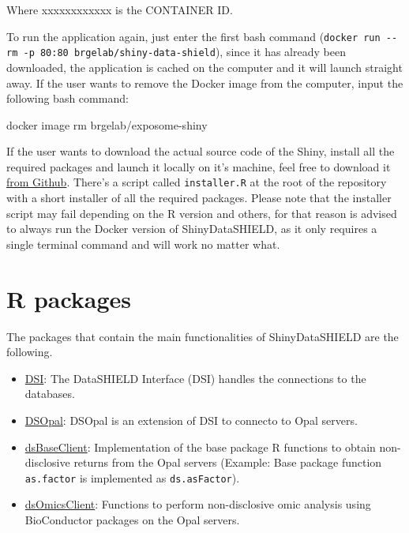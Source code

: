 \documentclass[
]{book}
\newenvironment{Shaded}{\begin{snugshade}}{\end{snugshade}}
\newcommand{\ExtensionTok}[1]{#1}
\newcommand{\NormalTok}[1]{#1}
\providecommand{\tightlist}{%
  \setlength{\itemsep}{0pt}\setlength{\parskip}{0pt}}
\begin{document}
Where xxxxxxxxxxxx is the CONTAINER ID.

To run the application again, just enter the first bash command (\texttt{docker\ run\ -\/-rm\ -p\ 80:80\ brgelab/shiny-data-shield}), since it has already been downloaded, the application is cached on the computer and it will launch straight away. If the user wants to remove the Docker image from the computer, input the following bash command:

\begin{Shaded}
\begin{Highlighting}[]
\ExtensionTok{docker}\NormalTok{ image rm brgelab/exposome-shiny}
\end{Highlighting}
\end{Shaded}

If the user wants to download the actual source code of the Shiny, install all the required packages and launch it locally on it's machine, feel free to download it \href{https://github.com/isglobal-brge/dsOmicsShiny}{from Github}. There's a script called \texttt{installer.R} at the root of the repository with a short installer of all the required packages. Please note that the installer script may fail depending on the R version and others, for that reason is advised to always run the Docker version of ShinyDataSHIELD, as it only requires a single terminal command and will work no matter what.

\hypertarget{r-packages}{%
\chapter{R packages}\label{r-packages}}

The packages that contain the main functionalities of ShinyDataSHIELD are the following.

\begin{itemize}
\tightlist
\item
  \href{https://github.com/datashield/DSI}{DSI}: The DataSHIELD Interface (DSI) handles the connections to the databases.
\item
  \href{https://github.com/datashield/DSOpal}{DSOpal}: DSOpal is an extension of DSI to connecto to Opal servers.
\item
  \href{https://github.com/datashield/dsBaseClient}{dsBaseClient}: Implementation of the base package R functions to obtain non-disclosive returns from the Opal servers (Example: Base package function \texttt{as.factor} is implemented as \texttt{ds.asFactor}).
\item
  \href{https://github.com/isglobal-brge/dsOmicsClient}{dsOmicsClient}: Functions to perform non-disclosive omic analysis using BioConductor packages on the Opal servers.
\end{itemize}
\end{document}
